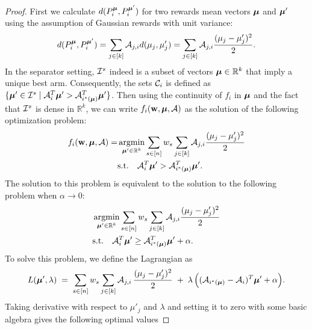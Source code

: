 \begin{proof}
            First we calculate $d(P^{\boldsymbol{\mu}}_{i}, P^{\boldsymbol{\mu}'}_{i})$ for two rewards mean vectors $\boldsymbol{\mu}$ and $\boldsymbol{\mu}'$ using the assumption of Gaussian rewards with unit variance:
            \begin{align*}
                d(P^{\boldsymbol{\mu}}_{i}, P^{\boldsymbol{\mu}'}_{i}) = \sum_{j \in [k]} \mathcal{A}_{j,i} d(\mu_{j}, \mu'_{j}) = \sum_{j \in [k]} \mathcal{A}_{j,i} \frac{(\mu_{j} - \mu'_{j})^2}{2}. 
            \end{align*}
            In the separator setting, $\mathcal{I}^s$ indeed is a subset of vectors $\boldsymbol{\mu} \in \mathbb{R}^k$ that imply a unique best arm. Consequently, the sets $\mathcal{C}_i$ is defined as $\{ \boldsymbol{\mu}' \in \mathcal{I}^s \mid \mathcal{A}_i ^T \boldsymbol{\mu}' > \mathcal{A}_{i^*(\boldsymbol{\mu})}^T \boldsymbol{\mu}' \}$. Then using the continuity of $f_i$ in $\boldsymbol{\mu}$ and the fact that $\mathcal{I}^s$ is dense in $\mathbb{R}^k$, we can write $f_i(\mathbf{w}, \boldsymbol{\mu}, \mathcal{A})$ as the solution of the following optimization problem: 
            \begin{align*}
                \fiwmu = &\argmin_{{\bmu' \in \mathbb{R}^{k}}} \sum_{s \in [n]} w_s \sum_{j \in [k]} \A_{j,i}  \frac{(\mu_{j} - \mu'_{j})^2}{2} \\
                & \text{s.t.} \quad \A_i^T \bmu' > \A_{\istarmu}^T \bmu'.
            \end{align*}
            The solution to this problem is equivalent to the solution to the following problem when $\alpha \rightarrow 0$:
            \begin{align*}
                &\argmin_{\bmu' \in \mathbb{R}^{k}} \sum_{s \in [n]} w_s \sum_{j \in [k]} \A_{j,i}  \frac{(\mu_{j} - \mu'_{j})^2}{2} \\
                & \text{s.t.} \quad \A_i^T \bmu' \geq \A_{\istarmu}^T \bmu' + \alpha.
            \end{align*}
            To solve this problem, we define the Lagrangian as 
            \begin{align*}
                L(\boldsymbol{\mu}',\lambda) \;=\; \sum_{s \in [n]} w_s \sum_{j \in [k]} \mathcal{A}_{j,i}\,\frac{(\mu_{j} - \mu'_{j})^2}{2} \;+\; \lambda\,\Big((\mathcal{A}_{i^*(\boldsymbol{\mu})} - \mathcal{A}_i)^T \boldsymbol{\mu}' + \alpha \Big).
            \end{align*}
            Taking derivative with respect to \( \mu'_j \) and $\lambda$ and setting it to zero with some basic algebra gives the following optimal values

\end{proof}

